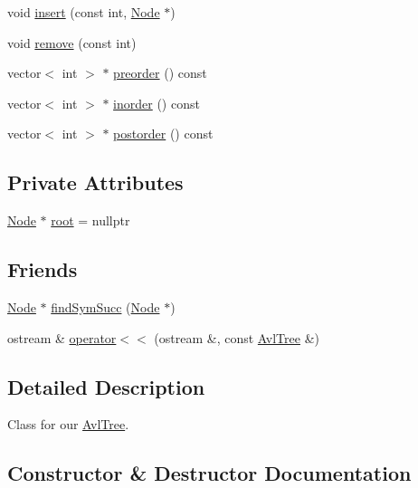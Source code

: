 \begin{DoxyCompactItemize}
\item 
void \mbox{\hyperlink{class_avl_tree_a5749646180a1cb2ec36c2830be294205}{insert}} (const int, \mbox{\hyperlink{struct_avl_tree_1_1_node}{Node}} $\ast$)
\item 
void \mbox{\hyperlink{class_avl_tree_ac8d4f996561392f0916caeaf48fac088}{remove}} (const int)
\item 
vector$<$ int $>$ $\ast$ \mbox{\hyperlink{class_avl_tree_a42a96ab786abdcd90a276681659de3cb}{preorder}} () const
\item 
vector$<$ int $>$ $\ast$ \mbox{\hyperlink{class_avl_tree_a5e48b6ecedf5fb5dfad0b5db9aa32254}{inorder}} () const
\item 
vector$<$ int $>$ $\ast$ \mbox{\hyperlink{class_avl_tree_abec8c49181cac2c7efe63a44c7da0f61}{postorder}} () const
\end{DoxyCompactItemize}
\subsection*{Private Attributes}
\begin{DoxyCompactItemize}
\item 
\mbox{\hyperlink{struct_avl_tree_1_1_node}{Node}} $\ast$ \mbox{\hyperlink{class_avl_tree_af08fafc721fec1c59bbade05b9115ebf}{root}} = nullptr
\end{DoxyCompactItemize}
\subsection*{Friends}
\begin{DoxyCompactItemize}
\item 
\mbox{\hyperlink{struct_avl_tree_1_1_node}{Node}} $\ast$ \mbox{\hyperlink{class_avl_tree_a906cd455324e75af412f0e8dcb275721}{find\+Sym\+Succ}} (\mbox{\hyperlink{struct_avl_tree_1_1_node}{Node}} $\ast$)
\item 
ostream \& \mbox{\hyperlink{class_avl_tree_ac676efc95b21ee681709baf45542c3a7}{operator$<$$<$}} (ostream \&, const \mbox{\hyperlink{class_avl_tree}{Avl\+Tree}} \&)
\end{DoxyCompactItemize}


\subsection{Detailed Description}
Class for our \mbox{\hyperlink{class_avl_tree}{Avl\+Tree}}. 

\subsection{Constructor \& Destructor Documentation}
\mbox{\label{class_avl_tree_ada89cb30925d36a56e3aab8768752468}} 
